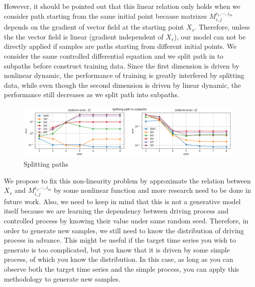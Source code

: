 \documentclass[12pt]{report}
\theoremstyle{definition}
\theoremstyle{remark}
\begin{document}
However, it should be pointed out that this linear relation only holds when we consider path starting from the same initial point because matrixes $M^{i_{1},\cdots,i_{m}}_{i,j}$ depends on the gradient of vector field at the starting point $X_{s}$. Therefore, unless the the vector field is linear (gradient independent of $X_{s}$), our model can not be directly applied if samples are paths starting from different initial points. We consider the same controlled differential equation and we split path in to subpaths before construct training data. Since the first dimension is driven by nonlinear dynamic, the performance of training is greatly interfered by splitting data, while even though the second dimension is driven by linear dynamic, the performance still decreases as we split path into subpaths. 
\begin{figure}[H]
  \centering
  \includegraphics[width=\textwidth]{figs/res7.png}
  \caption{Splitting paths}
\end{figure}
We propose to fix this non-linearity problem by approximate the relation between $X_{s}$ and $M^{i_{1},\cdots,i_{m}}_{i,j}$ by some nonlinear function and more research need to be done in future work. Also, we need to keep in mind that this is not a generative model itself because we are learning the dependency between driving process and controlled process by knowing their value under same random seed. Therefore, in order to generate new samples, we still need to know the distribution of driving process in advance. This might be useful if the target time series you wish to generate is too complicated, but you know that it is driven by some simple process, of which you know the distribution. In this case, as long as you can observe both the target time series and the simple process, you can apply this methodology to generate new samples.


\nocite{*}


\end{document}
